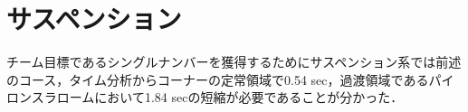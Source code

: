 \section{サスペンション}
チーム目標であるシングルナンバーを獲得するためにサスペンション系では前述のコース，タイム分析からコーナーの定常領域で0.54 sec，過渡領域であるパイロンスラロームにおいて1.84 secの短縮が必要であることが分かった．






